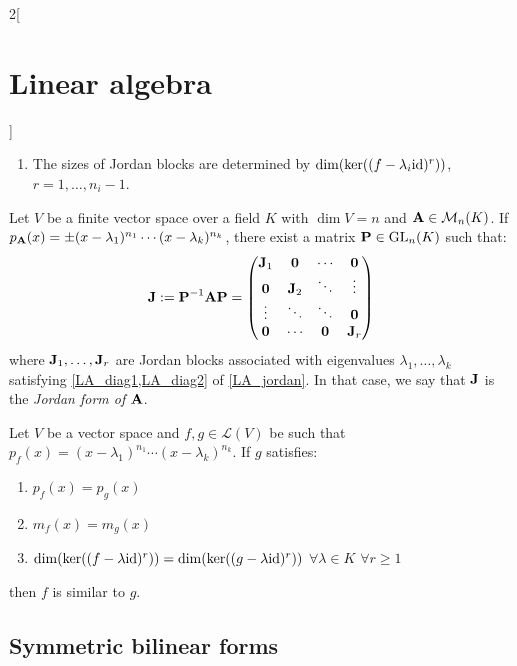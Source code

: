 \documentclass[../../../main.tex]{subfiles}
\begin{document}
\begin{multicols}{2}[\section{Linear algebra}]
\begin{prop}
\begin{enumerate}
      \item\label{LA_diag2} The sizes of Jordan blocks are determined by $\dim(\ker((f-\lambda_i\mathrm{id})^r))$, $r=1,\ldots,n_i-1$.
    \end{enumerate}
  \end{prop}
  \begin{prop}
    Let $V$ be a finite vector space over a field $K$ with $\dim V=n$ and $\boldsymbol{\mathrm{A}}\in\mathcal{M}_n(K)$. If $p_{\boldsymbol{\mathrm{A}}}(x)=\pm(x-\lambda_1)^{n_1}\cdots(x-\lambda_k)^{n_k}$, there exist a matrix $\boldsymbol{\mathrm{P}}\in\mathrm{GL}_n(K)$ such that:
    $$\boldsymbol{\mathrm{J}}:=\boldsymbol{\mathrm{P}}^{-1}\boldsymbol{\mathrm{A}}\boldsymbol{\mathrm{P}}=
      \begin{pmatrix}
        \boldsymbol{\mathrm{J}}_1 & \boldsymbol{\mathrm{0}}   & \cdots             & \boldsymbol{\mathrm{0}}   \\
        \boldsymbol{\mathrm{0}}   & \boldsymbol{\mathrm{J}}_2 & \ddots             & \vdots               \\
        \vdots               & \ddots               & \ddots             & \boldsymbol{\mathrm{0}}   \\
        \boldsymbol{\mathrm{0}}   & \cdots               & \boldsymbol{\mathrm{0}} & \boldsymbol{\mathrm{J}}_r \\
      \end{pmatrix}
    $$
    where $\boldsymbol{\mathrm{J}}_1,\ldots,\boldsymbol{\mathrm{J}}_r$ are Jordan blocks associated with eigenvalues $\lambda_1,\ldots,\lambda_k$ satisfying \cref{LA_diag1,LA_diag2} of \cref{LA_jordan}. In that case, we say that $\boldsymbol{\mathrm{J}}$ is the \textit{Jordan form of $\boldsymbol{\mathrm{A}}$}.
  \end{prop}
  \begin{theorem}
    Let $V$ be a vector space and $f,g\in\mathcal{L}(V)$ be such that $p_f(x)=(x-\lambda_1)^{n_1}\cdots(x-\lambda_k)^{n_k}$. If $g$ satisfies:
    \begin{enumerate}
      \item $p_f(x)=p_g(x)$
      \item $m_f(x)=m_g(x)$
      \item $\dim(\ker((f-\lambda \mathrm{id})^r))=\dim(\ker((g-\lambda \mathrm{id})^r))$ $\forall\lambda\in K$ $\forall r\geq 1$
    \end{enumerate}
    then $f$ is similar to $g$.
  \end{theorem}
  \subsection{Symmetric bilinear forms}

\end{multicols}
\end{document}
